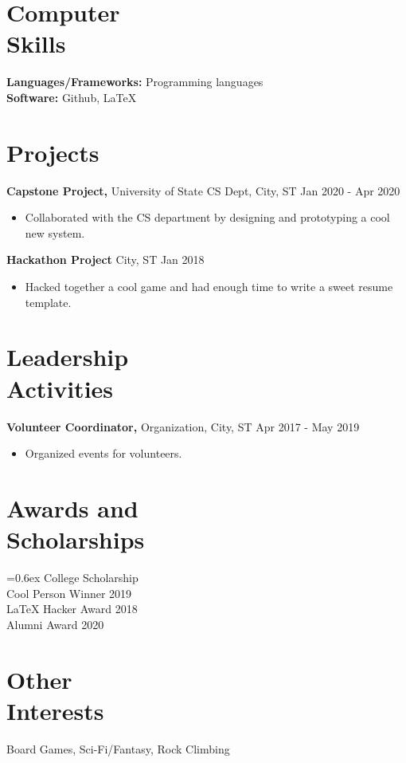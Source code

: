 \documentclass[line, margin, 11pt]{res}
\begin{document}
\begin{resume}
\section{Computer \\ Skills}
{\bf Languages/Frameworks:} Programming languages \\
{\bf Software:} Github, LaTeX

\section{Projects}
 {\bf Capstone Project,} University of State CS Dept, City, ST \hfill Jan 2020 - Apr 2020
         \vspace{4pt}
	\begin{itemize} \itemsep -2pt
         \item Collaborated with the CS department by designing and prototyping a cool new system.
	\end{itemize}
	
{\bf Hackathon Project} City, ST \hfill Jan 2018
        \vspace{4pt}
	\begin{itemize} \itemsep -2pt
           \item Hacked together a cool game and had enough time to write a sweet resume template.
	\end{itemize}

\section{Leadership \\ Activities}
{\bf Volunteer Coordinator,} Organization, City, ST \hfill Apr 2017 - May 2019
	\begin{itemize} \itemsep -2pt
	\item Organized events for volunteers.
	\end{itemize}

\section{Awards and \\ Scholarships} 
\vspace{-3pt}
\begin{multicols}{2}

{\small {}\font=0.6ex College Scholarship \\
Cool Person Winner 2019 \\
\columnbreak
LaTeX Hacker Award 2018 \\
Alumni Award 2020}
\end{multicols}

\section{Other \\ Interests}
	Board Games, Sci-Fi/Fantasy, Rock Climbing

\end{resume} 
\end{document}
